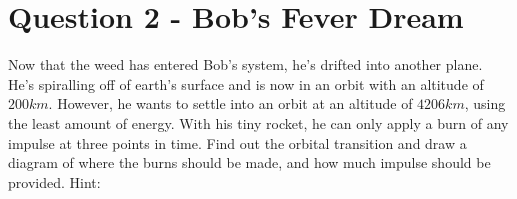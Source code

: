 \documentclass[a4paper, 12pt]{exam}
\begin{document}
	\pagebreak
	
	\section*{Question 2 - Bob's Fever Dream}
	Now that the weed has entered Bob's system, he's drifted into another plane. He's spiralling off of earth's surface and is now in an orbit with an altitude of $200km$. However, he wants to settle into an orbit at an altitude of $4206km$, using the least amount of energy. With his tiny rocket, he can only apply a burn of any impulse at three points in time. Find out the orbital transition and draw a diagram of where the burns should be made, and how much impulse should be provided. Hint:
	
	
	
	
	
	
\end{document}
